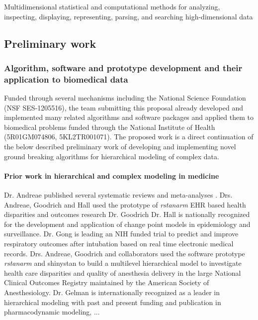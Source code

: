 \documentclass[11pt,notitlepage]{article}
\begin{document}
Multidimensional statistical and computational methods for analyzing, inspecting, displaying, representing, parsing, and searching high-dimensional data

\subsection*{Preliminary work}

  

\subsubsection*{Algorithm, software and prototype development and their application to biomedical data}
Funded through several mechanisms including the National Science Foundation (NSF SES-1205516), the team submitting this proposal already developed and implemented many related algorithms and software packages and applied them to biomedical problems funded through the National Institute of Health (5R01GM074806, 5KL2TR001071). The proposed work is a direct continuation of the below described preliminary work of developing and implementing novel ground breaking algorithms for hierarchical modeling of complex data.

\paragraph*{Prior work in hierarchical and complex modeling in medicine} Dr. Andreae published several systematic reviews and meta-analyses \cite{Andreae2013, Andreae2015, Carter2015}. Drs. Andreae, Goodrich and Hall used the prototype of \textit{rstanarm} EHR based health disparities and outcomes research \cite{AndreaeWhite2015} Dr. Goodrich Dr. Hall is nationally recognized for the development and application of change point models in epidemiology and surveillance. Dr. Gong is leading an NIH funded trial to predict and improve respiratory outcomes after intubation based on real time electronic medical records.  Drs. Andreae, Goodrich and collaborators used the software prototype \textit{rstanarm} and shinystan to build a multilevel hierarchical model to investigate health care disparities and quality of anesthesia delivery in the large National Clinical Outcomes Registry maintained by the American Society of Anesthesiology. Dr. Gelman is internationally recognized as a leader in hierarchical modeling with past and present funding and publication in pharmacodynamic modeling, ...
\end{document}
